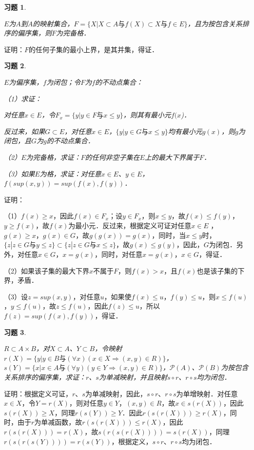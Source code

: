 \documentclass[12pt, a4paper, oneside]{book}
\newtheorem{exer}{习题}
\begin{document}
			\begin{exer}\label{exer88}
				\hfill\par
				$E$为$A$到$A$的映射集合，$F=\{X|X\subset A\text{与}f(X)\subset X\text{与}f\in E\}$，且为按包含关系排序的偏序集，则$F$为完备格．
			\end{exer}
			证明：$F$的任何子集的最小上界，是其并集，得证．
			
			\begin{exer}\label{exer89}
				\hfill\par
				$E$为偏序集，$f$为闭包；令$F$为$f$的不动点集合：
				\par
				（1）求证：
				\par
				对任意$x\in E$，令$F_x=\{y|y\in F\text{与}x\leq y\}$，则其有最小元$f(x$)．
				\par
				反过来，如果$G\subset E$，对任意$x\in E$，$\{y|y\in G\text{与}x\leq y\}$均有最小元$g(x)$，则$g$为闭包，且$G$为$g$的不动点集合．
				\par
				（2）$E$为完备格，求证：$F$的任何非空子集在$E$上的最大下界属于$F$．
				\par
				（3）如果$E$为格，求证：对任意$x\in E$、$y\in E$，$f(sup(x, y))=sup(f(x), f(y))$．
			\end{exer}
			证明：
			\par
			（1）$f(x)\geq x$，因此$f(x)\in F_x$；设$y\in F_x$，则$x\leq y$，故$f(x)\leq f(y)$，$y\geq f(x)$，故$f(x)$为最小元．反过来，根据定义可证对任意$x\in E$ ，$g(x)\geq x$，$g(x)\in G$，故$g(g(x))=g(x)$，同时，当$x\leq y$时，$\{z|z\in G\text{与}y\leq z\}\subset \{z|z\in G\text{与}x\leq z\}$，故$g(x)\leq g(y)$，因此，$G$为闭包．另外，对任意$x\in G$，$x=g(x)$，同时，对任意$x=g(x)$，$x\in G$，得证．
			\par
			（2）如果该子集的最大下界$x$不属于$F$，则$f(x)>x$，且$f(x)$也是该子集的下界，矛盾．
			\par
			（3）设$z=sup(x, y)$，对任意$u$，如果使$f(x)\leq u$，$f(y)\leq u$，则$x\leq f(u)$，$y\leq f(u)$，故$z\leq f(u)$，因此$f(z)\leq u$，所以$f(z)=sup(f(x), f(y))$，得证．
			
			\begin{exer}\label{exer90}
				\hfill\par
				$R\subset A\times B$，对$X\subset A$、$Y\subset B$，令映射$r(X)=\{y|y\in B\text{与}(\forall x)(x\in X\Rightarrow (x, y)\in R)\}$，$s(Y)=\{x|x\in A\text{与}(\forall y)(y\in Y\Rightarrow (x, y)\in R)\}$，$\mathcal{P}(A)$、$\mathcal{P}(B)$为按包含关系排序的偏序集，求证：$r$、$s$为单减映射，并且映射$s\circ r$、$r\circ s$均为闭包．
			\end{exer}
			证明：根据定义可证，$r$、$s$为单减映射，因此，$s\circ r$、$r\circ s$为单增映射．对任意$x\in X$，令$Y=r(X)$，则对任意$y\in Y$，$(x, y)\in R$，故$x\in s(r(X))$，因此$s(r(X))\geq X$，同理$r(s(Y))\geq Y$．因此$r(s(r(X)))\geq r(X)$，同时，由于$r$为单减函数，故$r(s(r(X)))\leq r(X)$，因此$r(s(r(X)))=r(X)$，故$s(r(s(r(X))))=s(r(X))$，同理$r(s(r(s(Y))))=r(s(Y))$，根据定义，$s\circ r$、$r\circ s$均为闭包．
			
\end{document}

